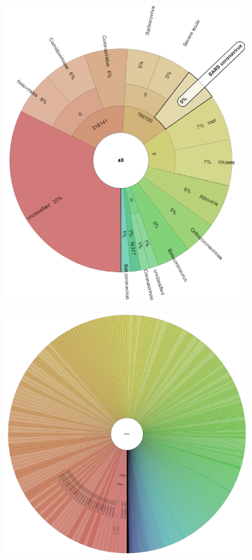 \begin{figure}[H]
\begin{subfigure}[b]{0.44\textwidth}
        \includegraphics[width=1\textwidth]{figures/results/real/krona/krona-ca-sSRR18680489.png}
        \label{fig:results:real:krona-ca-b}
        \end{subfigure}
        \hfill
        \begin{subfigure}[b]{0.44\textwidth}
        \includegraphics[width=1\textwidth]{figures/results/real/krona/krona-ca-all.png}

\end{subfigure}
\end{figure}
